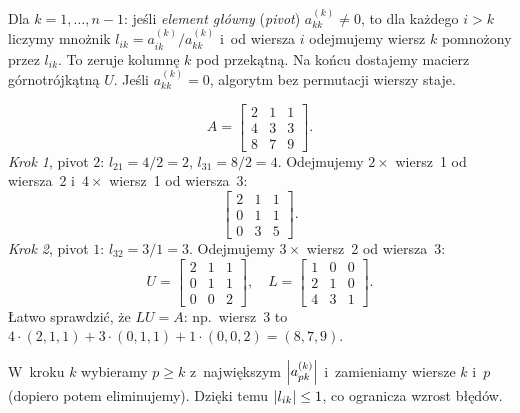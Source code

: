 \documentclass[11pt]{article}
\begin{document}
\begin{definicja}
Dla $k=1,\ldots,n-1$: jeśli \emph{element główny} (\emph{pivot})
$a^{(k)}_{kk}\ne0$, to dla każdego $i>k$ liczymy mnożnik
$l_{ik}=a^{(k)}_{ik}/a^{(k)}_{kk}$ i~od wiersza $i$ odejmujemy wiersz $k$
pomnożony przez $l_{ik}$. To zeruje kolumnę $k$ pod przekątną. Na końcu
dostajemy macierz górnotrójkątną $U$. Jeśli $a^{(k)}_{kk}=0$, algorytm
bez permutacji wierszy staje.
\end{definicja}

\begin{przyklad}
\[
A=\begin{bmatrix}2&1&1\\4&3&3\\8&7&9\end{bmatrix}.
\]
\emph{Krok 1}, pivot $2$: $l_{21}=4/2=2$, $l_{31}=8/2=4$.
Odejmujemy $2\times$ wiersz~1 od wiersza~2 i~$4\times$ wiersz~1 od
wiersza~3:
\[
\begin{bmatrix}2&1&1\\0&1&1\\0&3&5\end{bmatrix}.
\]
\emph{Krok 2}, pivot $1$: $l_{32}=3/1=3$. Odejmujemy $3\times$ wiersz~2
od wiersza~3:
\[
U=\begin{bmatrix}2&1&1\\0&1&1\\0&0&2\end{bmatrix},\quad
L=\begin{bmatrix}1&0&0\\2&1&0\\4&3&1\end{bmatrix}.
\]
Łatwo sprawdzić, że $LU=A$: np.\ wiersz~3 to
$4\cdot(2,1,1)+3\cdot(0,1,1)+1\cdot(0,0,2)=(8,7,9)$.
\end{przyklad}

\begin{definicja}
W~kroku $k$ wybieramy $p\ge k$ z~największym $\left\lvert a^{(k)}_{pk} \right\rvert$
i~zamieniamy wiersze $k$ i~$p$ (dopiero potem eliminujemy). Dzięki temu
$\left\lvert l_{ik} \right\rvert\le1$, co ogranicza wzrost błędów.
\end{definicja}
\end{document}
